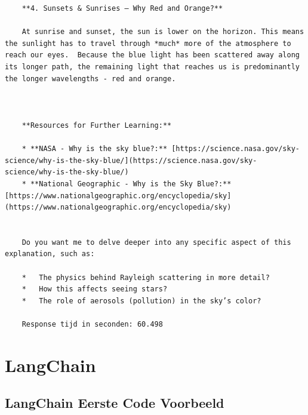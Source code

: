\begin{verbatim}
    **4. Sunsets & Sunrises – Why Red and Orange?**
    
    At sunrise and sunset, the sun is lower on the horizon. This means the sunlight has to travel through *much* more of the atmosphere to reach our eyes.  Because the blue light has been scattered away along its longer path, the remaining light that reaches us is predominantly the longer wavelengths - red and orange.
    
    
    
    **Resources for Further Learning:**
    
    * **NASA - Why is the sky blue?:** [https://science.nasa.gov/sky-science/why-is-the-sky-blue/](https://science.nasa.gov/sky-science/why-is-the-sky-blue/)
    * **National Geographic - Why is the Sky Blue?:** [https://www.nationalgeographic.org/encyclopedia/sky](https://www.nationalgeographic.org/encyclopedia/sky)
    
    
    Do you want me to delve deeper into any specific aspect of this explanation, such as:
    
    *   The physics behind Rayleigh scattering in more detail?
    *   How this affects seeing stars?
    *   The role of aerosols (pollution) in the sky’s color?
    
    Response tijd in seconden: 60.498
\end{verbatim}

\section{LangChain}
\label{sec:langchain2}

\subsection{LangChain Eerste Code Voorbeeld}
\label{ssec:langchaineerstecodevoorbeeld}

